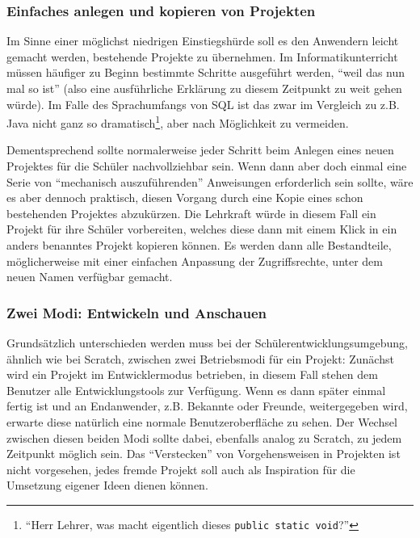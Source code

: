 

\subsubsection{Einfaches anlegen und kopieren von Projekten}

Im Sinne einer möglichst niedrigen Einstiegshürde soll es den Anwendern leicht gemacht werden, bestehende Projekte zu übernehmen. Im Informatikunterricht müssen häufiger zu Beginn bestimmte Schritte ausgeführt werden, ``weil das nun mal so ist'' (also eine ausführliche Erklärung zu diesem Zeitpunkt zu weit gehen würde). Im Falle des Sprachumfangs von SQL ist das zwar im Vergleich zu z.B. Java nicht ganz so dramatisch\footnote{``Herr Lehrer, was macht eigentlich dieses \texttt{public static void}?''}, aber nach Möglichkeit zu vermeiden.

Dementsprechend sollte normalerweise jeder Schritt beim Anlegen eines neuen Projektes für die Schüler nachvollziehbar sein. Wenn dann aber doch einmal eine Serie von ``mechanisch auszuführenden'' Anweisungen erforderlich sein sollte, wäre es aber dennoch praktisch, diesen Vorgang durch eine Kopie eines schon bestehenden Projektes abzukürzen. Die Lehrkraft würde in diesem Fall ein Projekt für ihre Schüler vorbereiten, welches diese dann mit einem Klick in ein anders benanntes Projekt kopieren können. Es werden dann alle Bestandteile, möglicherweise mit einer einfachen Anpassung der Zugriffsrechte, unter dem neuen Namen verfügbar gemacht.

\subsubsection{Zwei Modi: Entwickeln und Anschauen}

Grundsätzlich unterschieden werden muss bei der Schülerentwicklungsumgebung, ähnlich wie bei Scratch, zwischen zwei Betriebsmodi für ein Projekt: Zunächst wird ein Projekt im Entwicklermodus betrieben, in diesem Fall stehen dem Benutzer alle Entwicklungstools zur Verfügung. Wenn es dann später einmal fertig ist und an Endanwender, z.B. Bekannte oder Freunde, weitergegeben wird, erwarte diese natürlich eine normale Benutzeroberfläche zu sehen. Der Wechsel zwischen diesen beiden Modi sollte dabei, ebenfalls analog zu Scratch, zu jedem Zeitpunkt möglich sein. Das ``Verstecken'' von Vorgehensweisen in Projekten ist nicht vorgesehen, jedes fremde Projekt soll auch als Inspiration für die Umsetzung eigener Ideen dienen können.


